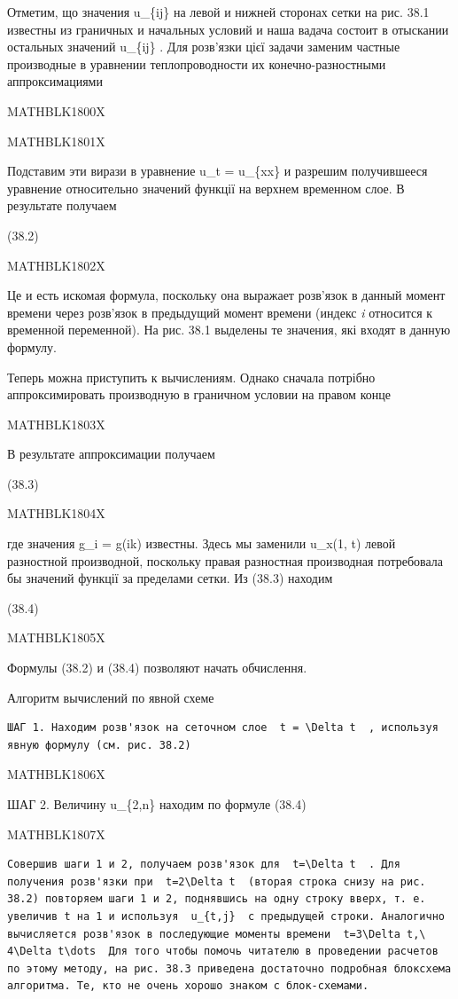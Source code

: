 \documentclass[
  ukrainian,
]{article}
\begin{document}
Отметим, що значения u\_\{ij\} на левой и нижней сторонах сетки на рис.
38.1 известны из граничных и начальных условий и наша вадача состоит в
отыскании остальных значений u\_\{ij\} . Для розв'язки цієї задачи
заменим частные производные в уравнении теплопроводности их
конечно-разностными аппроксимациями

MATHBLK1800X

MATHBLK1801X

Подставим эти вирази в уравнение u\_t = u\_\{xx\} и разрешим
получившееся уравнение относительно значений функції на верхнем
временном слое. В результате получаем

(38.2)

MATHBLK1802X

Це и есть искомая формула, поскольку она выражает розв'язок в данный
момент времени через розв'язок в предыдущий момент времени (индекс
\emph{i} относится к временной переменной). На рис. 38.1 выделены те
значения, які входят в данную формулу.

Теперь можна приступить к вычислениям. Однако сначала потрібно
аппроксимировать производную в граничном условии на правом конце

MATHBLK1803X

В результате аппроксимации получаем

(38.3)

MATHBLK1804X

где значения g\_i = g(ik) известны. Здесь мы заменили u\_x(1, t) левой
разностной производной, поскольку правая разностная производная
потребовала бы значений функції за пределами сетки. Из (38.3) находим

(38.4)

MATHBLK1805X

Формулы (38.2) и (38.4) позволяют начать обчислення.

Алгоритм вычислений по явной схеме

\begin{verbatim}
ШАГ 1. Находим розв'язок на сеточном слое  t = \Delta t  , используя явную формулу (см. рис. 38.2)
\end{verbatim}

MATHBLK1806X

ШАГ 2. Величину u\_\{2,n\} находим по формуле (38.4)

MATHBLK1807X

\begin{verbatim}
Совершив шаги 1 и 2, получаем розв'язок для  t=\Delta t  . Для получения розв'язки при  t=2\Delta t  (вторая строка снизу на рис. 38.2) повторяем шаги 1 и 2, поднявшись на одну строку вверх, т. е. увеличив t на 1 и используя  u_{t,j}  с предыдущей строки. Аналогично вычисляется розв'язок в последующие моменты времени  t=3\Delta t,\ 4\Delta t\dots  Для того чтобы помочь читателю в проведении расчетов по этому методу, на рис. 38.3 приведена достаточно подробная блоксхема алгоритма. Те, кто не очень хорошо знаком с блок-схемами.
\end{verbatim}
\end{document}
